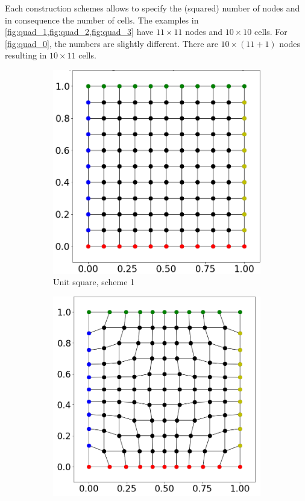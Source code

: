 Each construction schemes allows to specify the (squared) number of nodes and in consequence the number of cells. The examples in \cref{fig:quad_1,fig:quad_2,fig:quad_3} have $11 \times 11$ nodes and $10 \times 10$ cells. For \cref{fig:quad_0}, the numbers are slightly different. There are $10 \times (11 + 1)$ nodes resulting in $10 \times 11$ cells.

\begin{figure}%
  \centering%
  \begin{subfigure}[t]{0.48\textwidth}%
    \centering%
    \includegraphics[width=\textwidth]{images/fiber_creation/quad_1.png}%
    \caption{Unit square, scheme 1}%
    \label{fig:quad_1}%
  \end{subfigure}
  \quad
  \begin{subfigure}[t]{0.48\textwidth}%
    \centering%
    \includegraphics[width=\textwidth]{images/fiber_creation/quad_2.png}%

\end{subfigure}
\end{figure}
